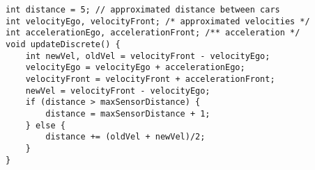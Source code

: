 \begin{lstlisting}[language={[GUI]Uppaal},
  caption={\uppaal code example listing.},
  label={lst:example}]
int distance = 5; // approximated distance between cars
int velocityEgo, velocityFront; /* approximated velocities */
int accelerationEgo, accelerationFront; /** acceleration */
void updateDiscrete() {
    int newVel, oldVel = velocityFront - velocityEgo;
    velocityEgo = velocityEgo + accelerationEgo;
    velocityFront = velocityFront + accelerationFront;
    newVel = velocityFront - velocityEgo;
    if (distance > maxSensorDistance) {
        distance = maxSensorDistance + 1;
    } else {
        distance += (oldVel + newVel)/2;
    }
}
\end{lstlisting}
